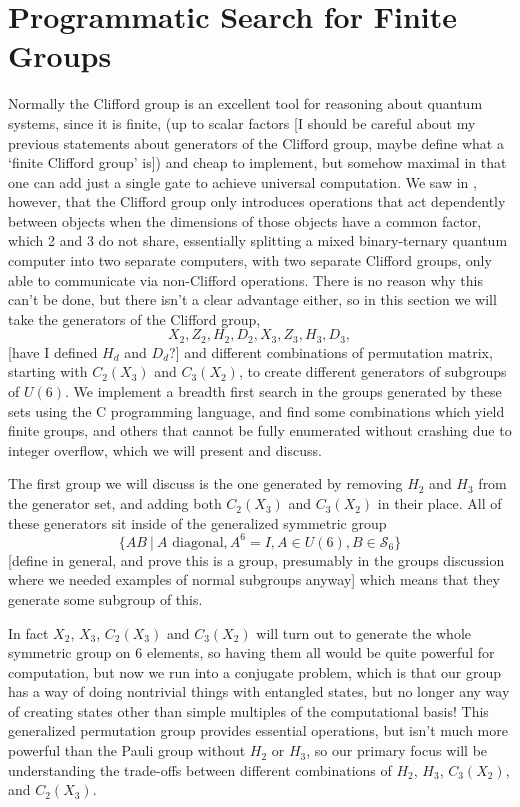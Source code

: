 \section{Programmatic Search for Finite Groups}
Normally the Clifford group is an excellent tool for reasoning about quantum systems, since it is finite, (up to scalar factors [I should be careful about my previous statements about generators of the Clifford group, maybe define what a `finite Clifford group' is]) and cheap to implement, but somehow maximal in that one can add just a single gate to achieve universal computation. We saw in \cite{tolar-clifford}, however, that the Clifford group only introduces operations that act dependently between objects when the dimensions of those objects have a common factor, which 2 and 3 do not share, essentially splitting a mixed binary-ternary quantum computer into two separate computers, with two separate Clifford groups, only able to communicate via non-Clifford operations. There is no reason why this can't be done, but there isn't a clear advantage either, so in this section we will take the generators of the Clifford group,
\[X_2, Z_2, H_2, D_2, X_3, Z_3, H_3, D_3,\]
[have I defined $H_d$ and $D_d$?]
and different combinations of permutation matrix, starting with $C_2(X_3)$ and $C_3(X_2)$, to create different generators of subgroups of $U(6)$. We implement a breadth first search in the groups generated by these sets using the C programming language, and find some combinations which yield finite groups, and others that cannot be fully enumerated without crashing due to integer overflow, which we will present and discuss.

The first group we will discuss is the one generated by removing $H_2$ and $H_3$ from the generator set, and adding both $C_2(X_3)$ and $C_3(X_2)$ in their place. All of these generators sit inside of the generalized symmetric group
\[\{AB\ |\ A\text{\ diagonal}, A^6 = I, A \in U(6), B \in \mathcal{S}_6\}\]
[define in general, and prove this is a group, presumably in the groups discussion where we needed examples of normal subgroups anyway]
which means that they generate some subgroup of this.

In fact $X_2$, $X_3$, $C_2(X_3)$ and $C_3(X_2)$ will turn out to generate the whole symmetric group on 6 elements, so having them all would be quite powerful for computation, but now we run into a conjugate problem, which is that our group has a way of doing nontrivial things with entangled states, but no longer any way of creating states other than simple multiples of the computational basis! This generalized permutation group provides essential operations, but isn't much more powerful than the Pauli group without $H_2$ or $H_3$, so our primary focus will be understanding the trade-offs between different combinations of $H_2$, $H_3$, $C_3(X_2)$, and $C_2(X_3)$.
